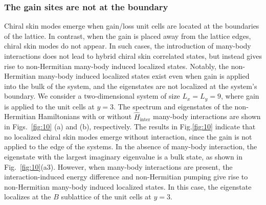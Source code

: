 \documentclass[longbibliography, aps, prx, amsmath, amssymb, amsfonts, twocolumn,superscriptaddress, footinbib]{revtex4-1}
\begin{document}
	\subsubsection{The gain sites are not at the boundary}


	Chiral skin modes emerge when gain/loss unit cells are located at the boundaries of the lattice. 
	In contrast, when the gain is placed away from the lattice edges, chiral skin modes do not appear. In such cases, the introduction of many-body interactions does not lead to hybrid chiral skin correlated states, but instead gives rise to non-Hermitian many-body induced localized states. 
	Notably, the non-Hermitian many-body induced localized states exist even when gain is applied into the bulk of the system, and the eigenstates are not localized at the system's boundary.
	We consider a two-dimensional system of size $L_x = L_y = 9$, where gain is applied to the unit cells at $y = 3$. 
	The spectrum and eigenstates of the non-Hermitian Hamiltonians with or without $\hat{H}_{\text{inter}}$ many-body interactions are shown in Figs.~\ref{fig:10} (a) and (b), respectively. 
	The results in Fig.\ref{fig:10} indicate that no localized chiral skin modes emerge without interaction, since the gain is not applied to the edge of the systems. 
	In the absence of many-body interaction, the eigenstate with the largest imaginary eigenvalue is a bulk state, as shown in Fig.~\ref{fig:10}(a3). However, when many-body interactions are present, the interaction-induced energy difference and non-Hermitian pumping give rise to non-Hermitian many-body induced localized states. In this case, the eigenstate localizes at the $B$ sublattice of the unit cells at $y = 3$.
\end{document}
